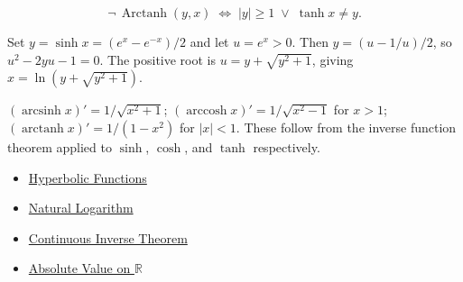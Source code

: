 \begin{remark*}
\[
  \neg\,\operatorname{Arctanh}(y,x)
  \;\iff\;
  |y|\geq 1 \;\vee\; \tanh x \neq y.
\]
\end{remark*}

\begin{remark*}
Set $y = \sinh x = (e^x - e^{-x})/2$ and let $u = e^x > 0$. Then
$y = (u - 1/u)/2$, so $u^2 - 2yu - 1 = 0$. The positive root is
$u = y + \sqrt{y^2+1}$, giving $x = \ln(y+\sqrt{y^2+1})$.
\end{remark*}

\begin{remark*}[Derivatives]
$(\operatorname{arcsinh} x)' = 1/\sqrt{x^2+1}$;\;
$(\operatorname{arccosh} x)' = 1/\sqrt{x^2-1}$ for $x > 1$;\;
$(\operatorname{arctanh} x)' = 1/(1-x^2)$ for $|x| < 1$.
These follow from the inverse function theorem applied to $\sinh$,
$\cosh$, and $\tanh$ respectively.
\end{remark*}

\begin{dependencies}
\begin{itemize}
  \item \hyperref[def:hyperbolic]{Hyperbolic Functions}
  \item \hyperref[def:natural-logarithm]{Natural Logarithm}
  \item \hyperref[thm:continuous-inverse-theorem]{Continuous Inverse Theorem}
  \item \hyperref[def:real-chapter-absolute-value-on-r]{Absolute Value on $\mathbb{R}$}
\end{itemize}
\end{dependencies}
